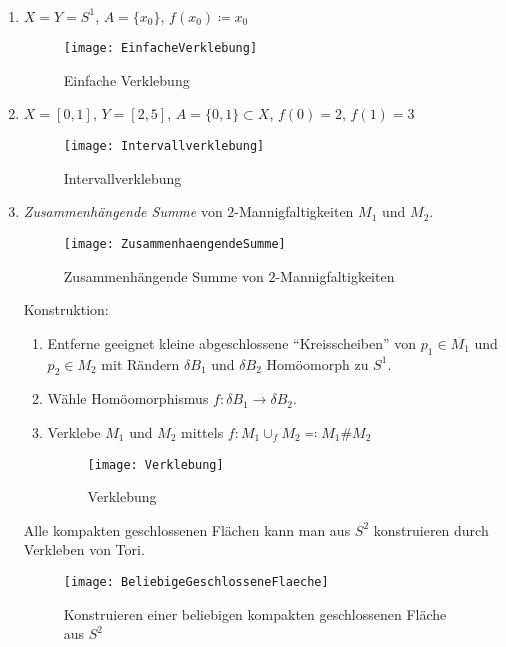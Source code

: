 \begin{example} \
  \begin{enumerate}
    \item \( X = Y = S^1 \), \( A = \{ x_0 \} \), \( f(x_0) \coloneqq x_0 \)
      \begin{figure}[H]
        \texttt{[image: EinfacheVerklebung]}
        \caption{Einfache Verklebung}
      \end{figure}
    \item \( X = [0,1] \), \( Y = [2,5] \), \( A = \{ 0,1 \} \subset X \), \( f(0) = 2 \), \( f(1) = 3 \)
    \begin{figure}[H]
      \texttt{[image: Intervallverklebung]}
      \caption{Intervallverklebung}
    \end{figure}
    \item \emph{Zusammenhängende Summe} von \( 2 \)-Mannigfaltigkeiten \( M_1 \) und \( M_2 \).
      \begin{figure}[H]
        \texttt{[image: ZusammenhaengendeSumme]}
        \caption{Zusammenhängende Summe von \( 2 \)-Mannigfaltigkeiten}
      \end{figure}
      Konstruktion:
      \begin{enumerate}
        \item Entferne geeignet kleine abgeschlossene ``Kreisscheiben'' von \( p_1 \in M_1 \) und \( p_2 \in M_2 \) mit Rändern \( \delta B_1 \) und \( \delta B_2 \) Homöomorph zu \( S^1 \).
        \item Wähle Homöomorphismus \( f: \delta B_1 \to \delta B_2 \).
        \item Verklebe \( M_1 \) und \( M_2 \) mittels \( f : M_1 \cup_f M_2 \eqqcolon M_1 \# M_2 \)
        \begin{figure}[H]
          \texttt{[image: Verklebung]}
          \caption{Verklebung}
        \end{figure}
      \end{enumerate}
      Alle kompakten geschlossenen Flächen kann man aus \( S^2 \) konstruieren durch Verkleben von Tori.
      \begin{figure}[H]
        \texttt{[image: BeliebigeGeschlosseneFlaeche]}
        \caption{Konstruieren einer beliebigen kompakten geschlossenen Fläche aus \( S^2 \)}
      \end{figure}
  \end{enumerate}
\end{example}

